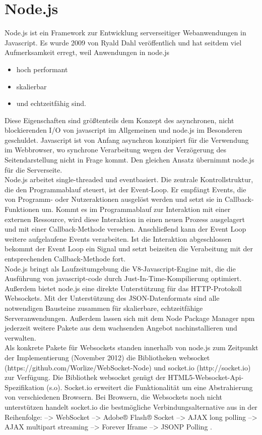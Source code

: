 \section{Node.js}\label{Node.js}
Node.js ist ein Framework zur Entwicklung serverseitiger Webanwendungen in Javascript. Es wurde 2009 von Ryald Dahl veröffentlich und hat seitdem viel Aufmerksamkeit erregt, weil Anwendungen in node.js
\begin{itemize}
\item hoch performant
\item skalierbar
\item und echtzeitfähig sind.
\end{itemize}
Diese Eigenschaften sind größtenteils dem Konzept des asynchronen, nicht blockierenden I/O von javascript im Allgemeinen und node.js im Besonderen geschuldet.
Javascript ist von Anfang asynchron konzipiert für die Verwendung im Webbrowser, wo synchrone Verarbeitung wegen der Verzögerung des Seitendarstellung nicht in Frage kommt. Den gleichen Ansatz übernimmt node.js für die Serverseite.
\\
Node.js arbeitet single-threaded und eventbasiert. Die zentrale Kontrollstruktur, die den Programmablauf steuert, ist der Event-Loop. Er empfängt Events, die von Programm- oder Nutzeraktionen ausgelöst werden und setzt sie in Callback-Funktionen um.
Kommt es im Programmablauf zur Interaktion mit einer externen Ressource, wird diese Interaktion in einen neuen Prozess ausgelagert und mit einer Callback-Methode versehen. Anschließend kann der Event Loop weitere aufgelaufene Events verarbeiten. Ist die Interaktion abgeschlossen bekommt der Event Loop ein Signal und setzt beizeiten die Verabeitung mit der entsprechenden Callback-Methode  fort.\\
Node.js bringt als Laufzeitumgebung die V8-Javascript-Engine mit, die die Ausführung von javascript-code durch Just-In-Time-Kompilierung optimiert. Außerdem bietet node.js eine direkte Unterstützung für das HTTP-Protokoll Websockets. Mit der Unterstützung des JSON-Datenformats sind alle notwendigen Bausteine zusammen für skalierbare, echtzeitfähige Serveranwendungen.
Außerdem lassen sich mit dem Node Package Manager npm jederzeit weitere Pakete aus dem wachsenden Angebot nachinstallieren und verwalten.\\
Als konkrete Pakete für Websockets standen innerhalb von node.js zum Zeitpunkt der Implementierung (November 2012) die Bibliotheken websocket (https://github.com/Worlize/WebSocket-Node) und socket.io (http://socket.io) zur Verfügung. Die Bibliothek websocket genügt der HTML5-Websocket-Api-Spezifikation (s.o). Socket.io erweitert die Funktionalität um eine Abstrahierung von verschiedenen Browsern. Bei Browsern, die Websockets noch nicht unterstützen handelt socket.io die bestmögliche Verbindungsalternative aus in der Reihenfolge: 
-->    WebSocket 
 -->   Adobe® Flash® Socket
  -->  AJAX long polling
   --> AJAX multipart streaming
 -->   Forever Iframe
 -->   JSONP Polling
.

